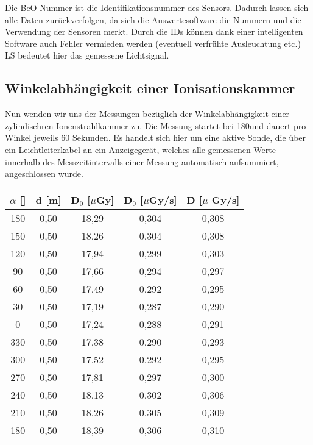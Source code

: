 Die BeO-Nummer ist die Identifikationsnummer des Sensors. Dadurch lassen sich alle Daten zurückverfolgen, da sich die Auswertesoftware die Nummern und die Verwendung der Sensoren merkt. Durch die IDs können dank einer intelligenten Software auch Fehler vermieden werden (eventuell verfrühte Ausleuchtung etc.) LS bedeutet hier das gemessene Lichtsignal.
		
\subsection{Winkelabhängigkeit einer Ionisationskammer} \label{sec:Ionkammer}

Nun wenden wir uns der Messungen bezüglich der Winkelabhängigkeit einer zylindischren Ionenstrahlkammer zu. Die Messung startet bei 180\textdegree und dauert pro Winkel jeweils 60 Sekunden.
Es handelt sich hier um eine aktive Sonde, die über ein Leichtleiterkabel an ein Anzeigegerät, welches alle gemessenen Werte innerhalb des Messzeitintervalls einer Messung automatisch aufsummiert, angeschlossen wurde.

\vspace{5mm}
	\begin{center}
		\begin{tabular}{c|c|c|c|c}
				\textbf{$\alpha$} [\textdegree] & \textbf{d} [m] & \textbf{D$_0$} [$\mu$Gy] & \textbf{\.D$_0$} [$\mu$Gy/s] & \textbf{\.D} [$\mu$ Gy/s] \\ 
		\hline	180 & 0,50 & 18,29 & 0,304 & 0,308 \\ 
				150 & 0,50 & 18,26 & 0,304 & 0,308 \\ 
				120 & 0,50 & 17,94 & 0,299 & 0,303 \\ 
				90  & 0,50 & 17,66 & 0,294 & 0,297 \\ 
				60  & 0,50 & 17,49 & 0,292 & 0,295 \\ 
				30  & 0,50 & 17,19 & 0,287 & 0,290 \\ 
				0   & 0,50 & 17,24 & 0,288 & 0,291 \\ 
				330 & 0,50 & 17,38 & 0,290 & 0,293 \\ 
				300 & 0,50 & 17,52 & 0,292 & 0,295 \\ 
				270 & 0,50 & 17,81 & 0,297 & 0,300 \\ 
				240 & 0,50 & 18,13 & 0,302 & 0,306 \\ 
			    210 & 0,50 & 18,26 & 0,305 & 0,309 \\ 
		\hline	180 & 0,50 & 18,39 & 0,306 & 0,310 \\ 
		\end{tabular} 
		\label{dft:Winkel}
	\end{center}
\vspace{5mm}				

